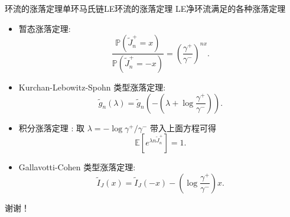 \documentclass{beamer}
\begin{document}
\begin{frame}{环流的涨落定理}{单环马氏链LE环流的涨落定理}
	LE净环流满足的各种涨落定理
	\begin{itemize}
		\item 暂态涨落定理:
		\begin{equation*}
		\frac{\mathbb{P}(\tilde{J}^+_n=x)}{\mathbb{P}(\tilde{J}^+_n=-x)}
		= \left(\frac{\gamma^+}{\gamma^-}\right)^{nx}.
		\end{equation*}
		
		\item Kurchan-Lebowitz-Spohn 类型涨落定理:
		\begin{equation*}
		\tilde{g}_n(\lambda)=\tilde{g}_n\left(-\left(\lambda+\log\frac{\gamma^+}{\gamma^-}\right)\right).
		\end{equation*}
		
		\item 积分涨落定理 : 取 $\lambda = -\log \gamma^+/\gamma^-$ 带入上面方程可得
		\begin{equation*}
		\mathbb{E}\left[e^{\lambda n\tilde{J}^+_n}\right]=1.
		\end{equation*}
		
		\item Gallavotti-Cohen 类型涨落定理:
		\begin{equation*}
		\tilde{I}_J(x)=\tilde{I}_J(-x)-\left(\log\frac{\gamma^+}{\gamma^-}\right)x.
		\end{equation*}
	\end{itemize}
\end{frame}








\begin{frame}
	\begin{center}
		\Huge 谢谢！
	\end{center}
\end{frame}
\end{document}
